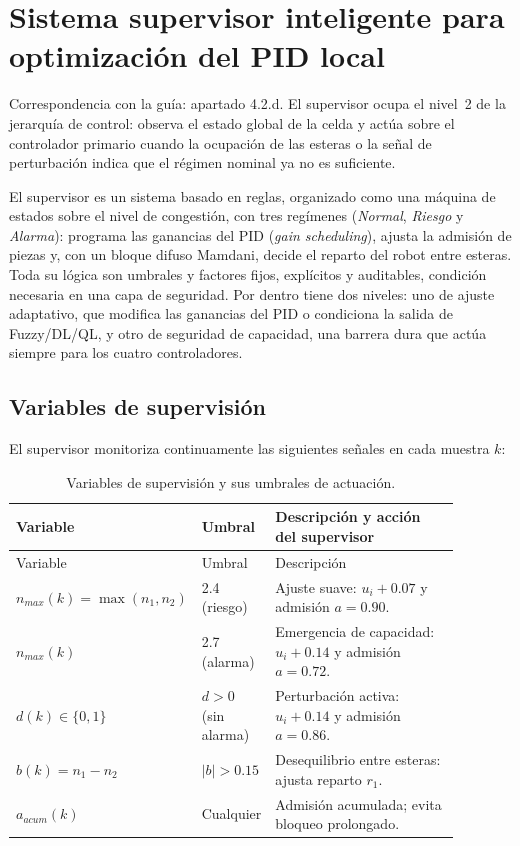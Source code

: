 \chapter[Sistema supervisor inteligente]{Sistema supervisor inteligente para optimización del PID local}
\label{ch:supervisor}

Correspondencia con la guía: apartado 4.2.d. El supervisor ocupa el nivel~2 de la jerarquía de control: observa el estado global de la celda y actúa sobre el controlador primario cuando la ocupación de las esteras o la señal de perturbación indica que el régimen nominal ya no es suficiente.

El supervisor es un sistema basado en reglas, organizado como una máquina de estados sobre el nivel de congestión, con tres regímenes (\emph{Normal}, \emph{Riesgo} y \emph{Alarma}): programa las ganancias del PID (\emph{gain scheduling}), ajusta la admisión de piezas y, con un bloque difuso Mamdani, decide el reparto del robot entre esteras. Toda su lógica son umbrales y factores fijos, explícitos y auditables, condición necesaria en una capa de seguridad. Por dentro tiene dos niveles: uno de ajuste adaptativo, que modifica las ganancias del PID o condiciona la salida de Fuzzy/DL/QL, y otro de seguridad de capacidad, una barrera dura que actúa siempre para los cuatro controladores.

\section{Variables de supervisión}

El supervisor monitoriza continuamente las siguientes señales en cada muestra $k$:

\begin{longtable}{@{}P{0.20\linewidth}P{0.15\linewidth}P{0.53\linewidth}@{}}
\caption{Variables de supervisión y sus umbrales de actuación.}
\label{tab:sv_variables}\\
\toprule
Variable & Umbral & Descripción y acción del supervisor \\ \midrule \endfirsthead
\toprule Variable & Umbral & Descripción \\ \midrule \endhead
$n_{max}(k) = \max(n_1,n_2)$ & 2.4 (riesgo) & Ajuste suave: $u_i\!+\!0.07$ y admisión $a=0.90$.\\
$n_{max}(k)$ & 2.7 (alarma) & Emergencia de capacidad: $u_i\!+\!0.14$ y admisión $a=0.72$.\\
$d(k) \in \{0,1\}$ & $d > 0$ (sin alarma) & Perturbación activa: $u_i\!+\!0.14$ y admisión $a=0.86$.\\
$b(k) = n_1 - n_2$ & $|b| > 0.15$ & Desequilibrio entre esteras: ajusta reparto $r_1$.\\
$a_{acum}(k)$ & Cualquier & Admisión acumulada; evita bloqueo prolongado.\\
\bottomrule
\end{longtable}

